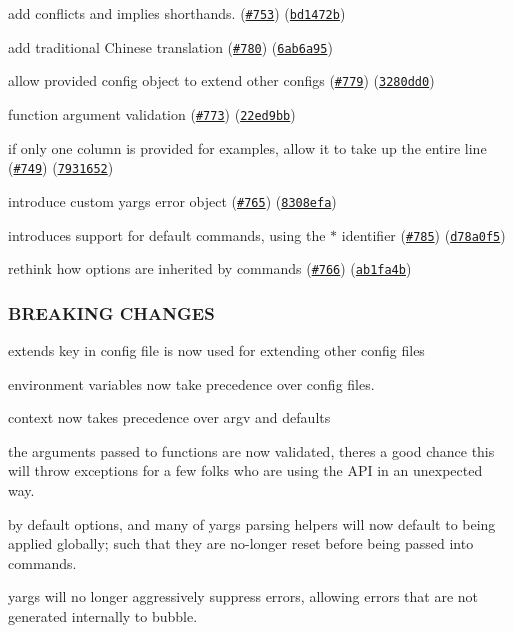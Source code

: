 \begin{DoxyItemize}
\item add conflicts and implies shorthands. (\href{https://github.com/yargs/yargs/issues/753}{\tt \#753}) (\href{https://github.com/yargs/yargs/commit/bd1472b}{\tt bd1472b})
\item add traditional Chinese translation (\href{https://github.com/yargs/yargs/issues/780}{\tt \#780}) (\href{https://github.com/yargs/yargs/commit/6ab6a95}{\tt 6ab6a95})
\item allow provided config object to extend other configs (\href{https://github.com/yargs/yargs/issues/779}{\tt \#779}) (\href{https://github.com/yargs/yargs/commit/3280dd0}{\tt 3280dd0})
\item function argument validation (\href{https://github.com/yargs/yargs/issues/773}{\tt \#773}) (\href{https://github.com/yargs/yargs/commit/22ed9bb}{\tt 22ed9bb})
\item if only one column is provided for examples, allow it to take up the entire line (\href{https://github.com/yargs/yargs/issues/749}{\tt \#749}) (\href{https://github.com/yargs/yargs/commit/7931652}{\tt 7931652})
\item introduce custom yargs error object (\href{https://github.com/yargs/yargs/issues/765}{\tt \#765}) (\href{https://github.com/yargs/yargs/commit/8308efa}{\tt 8308efa})
\item introduces support for default commands, using the \textquotesingle{}$\ast$\textquotesingle{} identifier (\href{https://github.com/yargs/yargs/issues/785}{\tt \#785}) (\href{https://github.com/yargs/yargs/commit/d78a0f5}{\tt d78a0f5})
\item rethink how options are inherited by commands (\href{https://github.com/yargs/yargs/issues/766}{\tt \#766}) (\href{https://github.com/yargs/yargs/commit/ab1fa4b}{\tt ab1fa4b})
\end{DoxyItemize}

\subsubsection*{B\+R\+E\+A\+K\+I\+NG C\+H\+A\+N\+G\+ES}


\begin{DoxyItemize}
\item {\ttfamily extends} key in config file is now used for extending other config files
\item environment variables now take precedence over config files.
\item context now takes precedence over argv and defaults
\item the arguments passed to functions are now validated, there\textquotesingle{}s a good chance this will throw exceptions for a few folks who are using the A\+PI in an unexpected way.
\item by default options, and many of yargs\textquotesingle{} parsing helpers will now default to being applied globally; such that they are no-\/longer reset before being passed into commands.
\item yargs will no longer aggressively suppress errors, allowing errors that are not generated internally to bubble.
\end{DoxyItemize}

